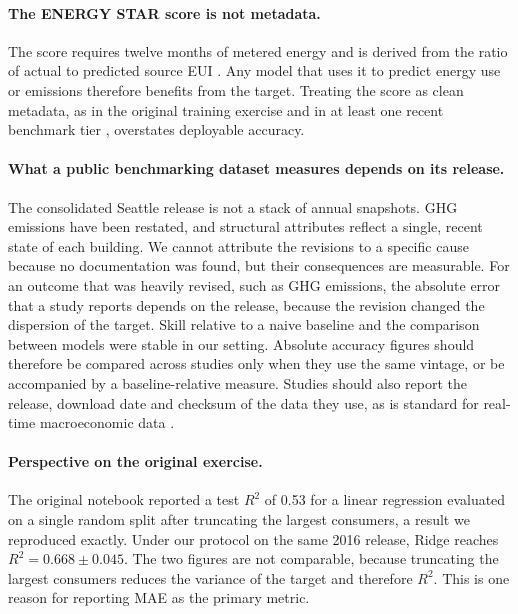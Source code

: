 \documentclass[11pt]{article}
\begin{document}
\paragraph{The ENERGY STAR score is not metadata.} The score requires twelve months of metered energy and is derived from the ratio of actual to predicted source EUI \cite{epa2021energystarscore}. Any model that uses it to predict energy use or emissions therefore benefits from the target. Treating the score as clean metadata, as in the original training exercise and in at least one recent benchmark tier \cite{duan2026ghgbench}, overstates deployable accuracy.

\paragraph{What a public benchmarking dataset measures depends on its release.} The consolidated Seattle release is not a stack of annual snapshots. GHG emissions have been restated, and structural attributes reflect a single, recent state of each building. We cannot attribute the revisions to a specific cause because no documentation was found, but their consequences are measurable. For an outcome that was heavily revised, such as GHG emissions, the absolute error that a study reports depends on the release, because the revision changed the dispersion of the target. Skill relative to a naive baseline and the comparison between models were stable in our setting. Absolute accuracy figures should therefore be compared across studies only when they use the same vintage, or be accompanied by a baseline-relative measure. Studies should also report the release, download date and checksum of the data they use, as is standard for real-time macroeconomic data \cite{croushore2001realtime,gebru2021datasheets}.

\paragraph{Perspective on the original exercise.} The original notebook reported a test $R^2$ of 0.53 for a linear regression evaluated on a single random split after truncating the largest consumers, a result we reproduced exactly. Under our protocol on the same 2016 release, Ridge reaches $R^2=0.668\pm0.045$. The two figures are not comparable, because truncating the largest consumers reduces the variance of the target and therefore $R^2$. This is one reason for reporting MAE as the primary metric.
\end{document}
